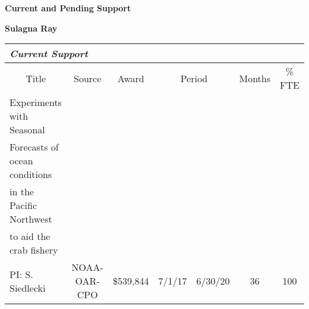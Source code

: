 \centerline{\bf Current and Pending Support}
\vspace{30pt}
\noindent
{\large \bf Sulagna Ray}

{\small
\noindent
\medskip
\noindent
\begin{flushleft}
\begin{tabular}{|p{2.1in}|c|c|r@{ -- }l|c|c|}
\multicolumn{7}{l}{\em Current Support\/} \\
\hline
\multicolumn{1}{|c|}{Title} & Source & Award &
\multicolumn{2}{c|}{Period} & Months & \% FTE \\
\hline\hline
\raggedright
Experiments with Seasonal \\ Forecasts of ocean conditions \\ in the Pacific Northwest \\ to aid the crab fishery \\  PI: S. Siedlecki & NOAA-OAR-CPO & \$539,844 & 7/1/17 & 6/30/20 & 36 & 100 \\ \hline
\end{tabular}\\[6pt]
\end{flushleft}
}